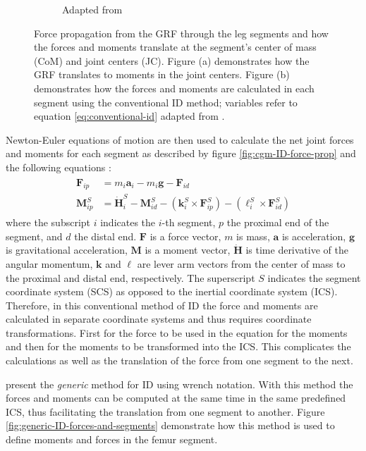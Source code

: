 \documentclass[../main.tex]{subfiles}
\begin{document}
\begin{figure}[!htb]
\begin{subfigure}[t]{0.45\textwidth}
        \caption{Adapted from \cite{Dumas2004}}
        \label{fig:ID-thigh-force-def}
    \end{subfigure}
    \caption{Force propagation from the \ac{GRF} through the leg segments and how the forces and moments translate at the segment's center of mass (CoM) and joint centers (JC). Figure (a) demonstrates how the \ac{GRF} translates to moments in the joint centers. Figure (b) demonstrates how the forces and moments are calculated in each segment using the conventional \ac{ID} method; variables refer to equation \ref{eq:conventional-id} adapted from \cite{Dumas2004}.}
    \label{fig:ID-forces-and-segments}
\end{figure}
Newton-Euler equations of motion are then used to calculate the net joint forces and moments for each segment as described by figure \ref{fig:cgm-ID-force-prop} and the following equations \cite{Dumas2004}:
\begin{align}
\label{eq:conventional-id}
\begin{split}
    \mathbf{F}_{ip} &= m_i\mathbf{a}_i - m_i\mathbf{g} - \mathbf{F}_{id} \\
    \mathbf{M}^S_{ip} &= \Dot{\mathbf{H}}^S_i - \mathbf{M}^S_{id} - (\mathbf{k}_i^S \times \mathbf{F}^S_{ip}) - (\ell^S_i\times\mathbf{F}^S_{id})
\end{split}
\end{align}
where the subscript $i$ indicates the $i$-th segment, $p$ the proximal end of the segment, and $d$ the distal end. $\mathbf{F}$ is a force vector, $m$ is mass, $\mathbf{a}$ is acceleration, $\mathbf{g}$ is gravitational acceleration, $\mathbf{M}$ is a moment vector, $\Dot{\mathbf{H}}$ is time derivative of the angular momentum, $\mathbf{k}$ and $\ell$ are lever arm vectors from the center of mass to the proximal and distal end, respectively.
The superscript $S$ indicates the segment coordinate system (SCS) as opposed to the inertial coordinate system (ICS).
Therefore, in this conventional method of \ac{ID} the force and moments are calculated in separate coordinate systems and thus requires coordinate transformations.
First for the force to be used in the equation for the moments and then for the moments to be transformed into the ICS.
This complicates the calculations as well as the translation of the force from one segment to the next.

\textcite{Dumas2004} present the \textit{generic} method for \ac{ID} using wrench notation.
With this method the forces and moments can be computed at the same time in the same predefined ICS, thus facilitating the translation from one segment to another.
Figure \ref{fig:generic-ID-forces-and-segments} demonstrate how this method is used to define moments and forces in the femur segment.
\end{document}
